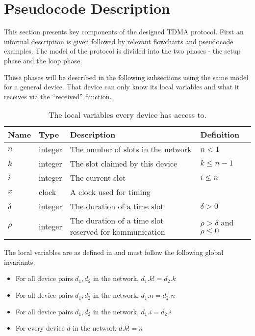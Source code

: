 \section{Pseudocode Description}
This section presents key components of the designed TDMA protocol. 
First an informal description is given followed by relevant flowcharts and pseudocode examples. 
The model of the protocol is divided into the two phases - the setup phase and the loop phase. 

These phases will be described in the following subsections using the same model for a general device. 
That device can only know its local variables and what it receives via the \enquote{received} function.

\begin{table}[H]
	\begin{tabularx}{\textwidth}{l l X l}
		\toprule
		Name		& Type		& Description & Definition\\
		\midrule
		$n$			& integer	& The number of slots in the network & $n < 1$\\
		$k$			& integer	& The slot claimed by this device & $k \leq n - 1$\\
		$i$			& integer	& The current slot & $i \leq n$\\
		$x$			& clock		& A clock used for timing\\
		$\delta$ 	& integer	& The duration of a time slot & $\delta > 0$\\
		$\rho$		& integer	& The duration of a time slot reserved for kommunication & $\rho > \delta$ and $\rho \leq 0$\\
		\bottomrule
	\end{tabularx}
	\caption{The local variables every device has access to.}
	\label{tab:locals}
\end{table}

The local variables are as defined in  and must follow the following global invariants:
\begin{itemize}
\item For all device pairs ${d_1, d_2}$ in the network, $d_1.k != d_2.k$
\item For all device pairs ${d_1, d_2}$ in the network, $d_1.n = d_2.n$
\item For all device pairs ${d_1, d_2}$ in the network, $d_1.i = d_2.i$
\item For every device $d$ in the network $d.k != n$
\end{itemize}

